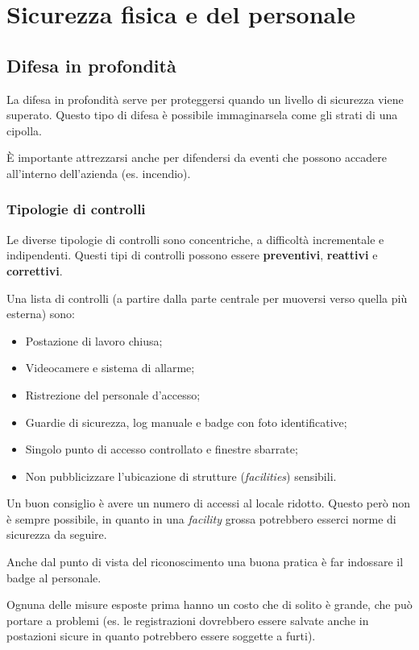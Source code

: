 \part{Sicurezza fisica e del personale}
\label{SFDP}
\chapter{Difesa in profondità}

La difesa in profondità serve per proteggersi quando un livello di sicurezza 
viene superato. Questo tipo di difesa è possibile immaginarsela come gli strati 
di una cipolla.

È importante attrezzarsi anche per difendersi da eventi che possono accadere 
all'interno dell'azienda (es. incendio).

\section{Tipologie di controlli}

Le diverse tipologie di controlli sono concentriche, a difficoltà incrementale e 
indipendenti. Questi tipi di controlli possono essere \textbf{preventivi}, 
\textbf{reattivi} e \textbf{correttivi}.

Una lista di controlli (a partire dalla parte centrale per muoversi 
verso quella più esterna) sono:

\begin{itemize}
\item Postazione di lavoro chiusa;
\item Videocamere e sistema di allarme;
\item Ristrezione del personale d'accesso;
\item Guardie di sicurezza, log manuale e badge con foto identificative;
\item Singolo punto di accesso controllato e finestre sbarrate;
\item Non pubblicizzare l'ubicazione di strutture (\textit{facilities})
sensibili.
\end{itemize}

Un buon consiglio è avere un numero di accessi al locale ridotto. Questo però 
non è sempre possibile, in quanto in una \textit{facility} grossa potrebbero 
esserci norme di sicurezza da seguire.

Anche dal punto di vista del riconoscimento una buona pratica è 
far indossare il badge al personale.

Ognuna delle misure esposte prima hanno un costo che di solito è grande, che 
può portare a problemi (es. le registrazioni dovrebbero essere 
salvate anche in postazioni sicure in quanto potrebbero essere soggette a furti).

